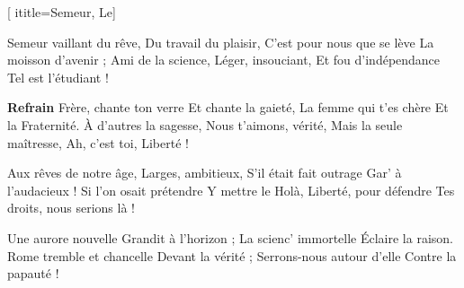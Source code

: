[
  ititle={Semeur, Le}]


\beginverse
Semeur vaillant du rêve,
Du travail du plaisir,
C'est pour nous que se lève
La moisson d'avenir ;
Ami de la science,
Léger, insouciant,
Et fou d'indépendance
Tel est l'étudiant !
\endverse

\beginchorus
\textbf{Refrain}
Frère, chante ton verre
Et chante la gaieté,
La femme qui t'es chère
Et la Fraternité.
À d'autres la sagesse,
Nous t'aimons, vérité,
Mais la seule maîtresse,
Ah, c'est toi, Liberté !
\endchorus

\beginverse
Aux rêves de notre âge,
Larges, ambitieux,
S'il était fait outrage
Gar' à l'audacieux !
Si l'on osait prétendre
Y mettre le Holà,
Liberté, pour défendre
Tes droits, nous serions là !
\endverse

\beginverse
Une aurore nouvelle
Grandit à l'horizon ;
La scienc' immortelle
Éclaire la raison.
Rome tremble et chancelle
Devant la vérité ;
Serrons-nous autour d'elle
Contre la papauté !
\endverse

\endsong
